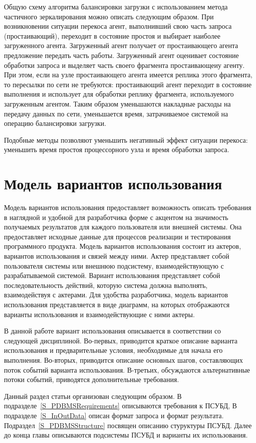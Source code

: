 \documentclass[11pt,oneside]{article}
\begin{document}
	\par Общую схему алгоритма балансировки загрузки с использованием метода частичного зеркалирования можно описать следующим образом. При возникновении ситуации перекоса агент, выполнивший свою часть запроса (простаивающий), переходит в состояние простоя и выбирает наиболее загруженного агента. Загруженный агент получает от простаивающего агента предложение передать часть работы. Загруженный агент оценивает состояние обработки запроса и выделяет часть своего фрагмента  простаивающеиу агенту. При этом, если на узле простаивающего агента имеется реплика этого фрагмента, то пересылки по сети не требуются: простаивающий агент переходит в состояние выполнения и использует для обработки реплику фрагмента, используемого загруженным агентом. Таким образом уменьшаются накладные расходы на передачу данных по сети, уменьшается время, затрачиваемое системой на операцию балансировки загрузки.
	\par Подобные методы позволяют уменьшить негативный эффект ситуации перекоса: уменьшить время простоя процессорного узла и время обработки запроса.
	
	\section{Модель вариантов использования}\label{S_UseCaseModel}
	\par Модель вариантов использования предоставляет возможность описать требования в наглядной и удобной для разработчика форме с акцентом на значимость получаемых результатов для каждого пользователя или внешней системы. Она предоставляет исходные данные для процессов реализации и тестирования программного продукта. Модель вариантов использования состоит из актеров, вариантов использования и связей между ними. Актер представляет собой пользователя системы или внешнюю подсистему, взаимодействующую с разрабатываемой системой. Вариант использования представляет собой последовательность действий, которую система должна выполнять, взаимодействуя с актерами. Для удобства разработчика, модель вариантов использования представляется в виде диаграмм, на которых отображаются варианты использования и взаимодействующие с ними актеры.
	\par В данной работе вариант использования  описывается в соответствии со следующей дисциплиной. Во-первых, приводится краткое описание варианта использования и предварительные условия, необходимые для начала его выполнения. Во-вторых, приводится описание основных шагов, составляющих поток событий варианта использования. В-третьих, обсуждаются альтернативные потоки событий, приводятся дополнительные требования.
	\par Данный раздел статьи организован следующим образом. В подразделе~\ref{S_PDBMSRequirements} описываются требования к ПСУБД, В подразделе~\ref{S_InOutData} описан формат запроса и формат результата. Подраздел~\ref{S_PDBMSStructure} посвящен описанию стуруктуры ПСУБД. Далее до конца главы описываются подсистемы ПСУБД и варианты их использования.
	
\end{document}
